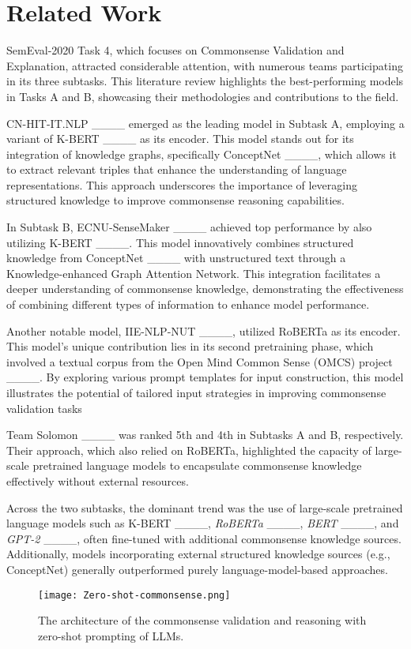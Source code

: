 \section{Related Work}
SemEval-2020 Task 4, which focuses on Commonsense Validation and Explanation, attracted considerable attention, with numerous teams participating in its three subtasks. This literature review highlights the best-performing models in Tasks A and B, showcasing their methodologies and contributions to the field.

CN-HIT-IT.NLP ____ emerged as the leading model in Subtask A, employing a variant of K-BERT  ____ as its encoder. This model stands out for its integration of knowledge graphs, specifically ConceptNet ____, which allows it to extract relevant triples that enhance the understanding of language representations. This approach underscores the importance of leveraging structured knowledge to improve commonsense reasoning capabilities.

In Subtask B, ECNU-SenseMaker ____ achieved top performance by also utilizing K-BERT ____. This model innovatively combines structured knowledge from ConceptNet ____ with unstructured text through a Knowledge-enhanced Graph Attention Network. This integration facilitates a deeper understanding of commonsense knowledge, demonstrating the effectiveness of combining different types of information to enhance model performance.

Another notable model, IIE-NLP-NUT ____, utilized RoBERTa as its encoder. This model's unique contribution lies in its second pretraining phase, which involved a textual corpus from the Open Mind Common Sense (OMCS) project ____. By exploring various prompt templates for input construction, this model illustrates the potential of tailored input strategies in improving commonsense validation tasks 


Team Solomon ____ was ranked 5th and 4th in Subtasks A and B, respectively. Their approach, which also relied on RoBERTa, highlighted the capacity of large-scale pretrained language models to encapsulate commonsense knowledge effectively without external resources. 

Across the two subtasks, the dominant trend was the use of large-scale pretrained language models such as  K-BERT  ____, \textit{RoBERTa} ____, \textit{BERT} ____, and \textit{GPT-2} ____, often fine-tuned with additional commonsense knowledge sources. Additionally, models incorporating external structured knowledge sources (e.g., ConceptNet) generally outperformed purely language-model-based approaches.
\begin{figure*}[t]
    \centering
  \texttt{[image: Zero-shot-commonsense.png]} \hfill
  \caption {The  architecture of the commonsense validation and reasoning with zero-shot prompting of LLMs.}
  \label{model architecture}
\end{figure*}